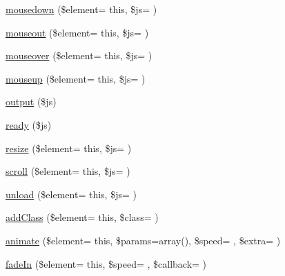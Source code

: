 \begin{DoxyCompactItemize}
\item 
\hyperlink{class_c_i___javascript_aa9e323abc6f90ab1db1aad2d7eb14634}{mousedown} (\$element= \textquotesingle{}this\textquotesingle{}, \$js= \textquotesingle{}\textquotesingle{})
\item 
\hyperlink{class_c_i___javascript_a2ad52a2253eef38cf959f3d102747e43}{mouseout} (\$element= \textquotesingle{}this\textquotesingle{}, \$js= \textquotesingle{}\textquotesingle{})
\item 
\hyperlink{class_c_i___javascript_a9bd9c5ff9af4f84698298d1b5c7d24d7}{mouseover} (\$element= \textquotesingle{}this\textquotesingle{}, \$js= \textquotesingle{}\textquotesingle{})
\item 
\hyperlink{class_c_i___javascript_aacc570d2bf7bb4aff0201ca8cdeb6944}{mouseup} (\$element= \textquotesingle{}this\textquotesingle{}, \$js= \textquotesingle{}\textquotesingle{})
\item 
\hyperlink{class_c_i___javascript_a95bc25e9063b14d257e97e4b205073ba}{output} (\$js)
\item 
\hyperlink{class_c_i___javascript_a00997e6137ed7dc0de0159ed143a107b}{ready} (\$js)
\item 
\hyperlink{class_c_i___javascript_a0469e725486d858e32cd09dc0d70e793}{resize} (\$element= \textquotesingle{}this\textquotesingle{}, \$js= \textquotesingle{}\textquotesingle{})
\item 
\hyperlink{class_c_i___javascript_a97e4228d9140645446f998f61e86af39}{scroll} (\$element= \textquotesingle{}this\textquotesingle{}, \$js= \textquotesingle{}\textquotesingle{})
\item 
\hyperlink{class_c_i___javascript_ad2978e51b7105fac8b8e4d84ea8ad6b8}{unload} (\$element= \textquotesingle{}this\textquotesingle{}, \$js= \textquotesingle{}\textquotesingle{})
\item 
\hyperlink{class_c_i___javascript_ac303e5ea1bff16e56b78e0e079c4f093}{add\+Class} (\$element= \textquotesingle{}this\textquotesingle{}, \$class= \textquotesingle{}\textquotesingle{})
\item 
\hyperlink{class_c_i___javascript_a55cfc996541b0f600762709fc300c5db}{animate} (\$element= \textquotesingle{}this\textquotesingle{}, \$params=array(), \$speed= \textquotesingle{}\textquotesingle{}, \$extra= \textquotesingle{}\textquotesingle{})
\item 
\hyperlink{class_c_i___javascript_a6c5bf9d34bbf53e47650a410697a547c}{fade\+In} (\$element= \textquotesingle{}this\textquotesingle{}, \$speed= \textquotesingle{}\textquotesingle{}, \$callback= \textquotesingle{}\textquotesingle{})

\end{DoxyCompactItemize}
